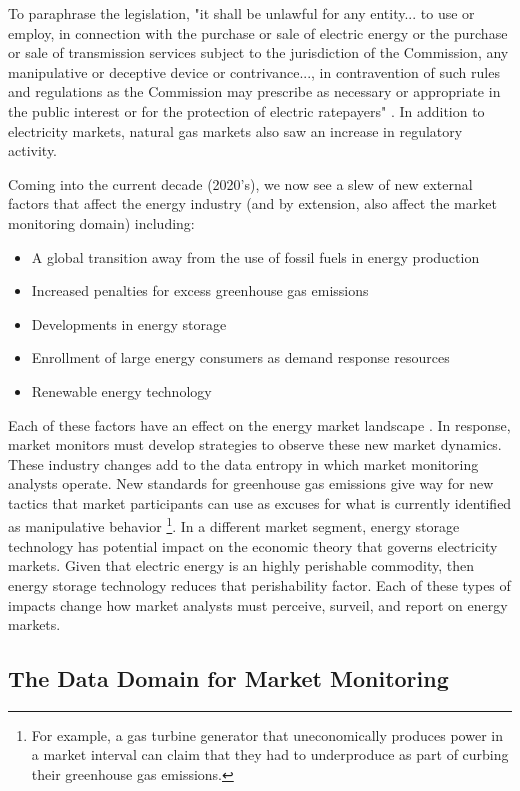 To paraphrase the legislation, "it shall be unlawful for any entity... to use or employ, in connection with the purchase or sale of electric energy or the purchase or sale of transmission services subject to the jurisdiction of the Commission, any manipulative or deceptive device or contrivance..., in contravention of such rules and regulations as the Commission may prescribe as necessary or appropriate in the public interest or for the protection of electric ratepayers" \cite{epa2005}. In addition to electricity markets, natural gas markets also saw an increase in regulatory activity.

Coming into the current decade (2020's), we now see a slew of new external factors that affect the energy industry (and by extension, also affect the market monitoring domain) including:

\begin{itemize}
    \item{A global transition away from the use of fossil fuels in energy production}
    \item{Increased penalties for excess greenhouse gas emissions}
    \item{Developments in energy storage}
    \item{Enrollment of large energy consumers as demand response resources}
    \item{Renewable energy technology}
\end{itemize} 

Each of these factors have an effect on the energy market landscape \cite{bichler}. In response, market monitors must develop strategies to observe these new market dynamics. These industry changes add to the data entropy in which market monitoring analysts operate. New standards for greenhouse gas emissions give way for new tactics that market participants can use as excuses for what is currently identified as manipulative behavior \footnote{For example, a gas turbine generator that uneconomically produces power in a market interval can claim that they had to underproduce as part of curbing their greenhouse gas emissions.}. In a different market segment, energy storage technology has potential impact on the economic theory that governs electricity markets. Given that electric energy is an highly perishable commodity, then energy storage technology reduces that perishability factor. Each of these types of impacts change how market analysts must perceive, surveil, and report on energy markets.

\subsection{The Data Domain for Market Monitoring}

